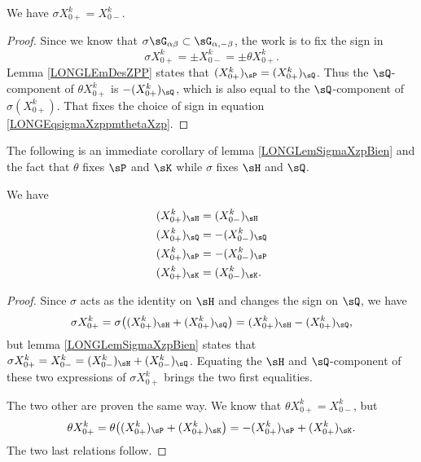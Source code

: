 \begin{lemma}				\label{LONGLemSigmaXzpBien}
	We have $\sigma X^k_{0+}=X^k_{0-}$.
\end{lemma}

\begin{proof}
	Since we know that $\sigma\sG_{\alpha\beta}\subset\sG_{\alpha,-\beta}$, the work is to fix the sign in
	\begin{equation}		\label{LONGEqsigmaXzppmthetaXzp}
		\sigma X^k_{0+}=\pm X^k_{0-}=\pm\theta X^k_{0+}.
	\end{equation}
	Lemma \ref{LONGLEmDesZPP} states that $(X_{0+}^k)_{\sP}=(X_{0+}^k)_{\sQ}$. Thus the $\sQ$-component of $\theta X^k_{0+}$ is $-(X^k_{0+})_{\sQ}$, which is also equal to the $\sQ$-component of $\sigma(X^k_{0+})$. That  fixes the choice of sign in equation \eqref{LONGEqsigmaXzppmthetaXzp}.
\end{proof}

The following is an immediate corollary of lemma \ref{LONGLemSigmaXzpBien} and the fact that $\theta$ fixes $\sP$ and $\sK$ while $\sigma$ fixes $\sH$ and $\sQ$.

\begin{corollary}		\label{LONGCorXzpHQPKXzm}
	We have
	\begin{subequations}
		\begin{align}
			(X^k_{0+})_{\sH}	&=(X^k_{0-})_{\sH}\\
			(X^k_{0+})_{\sQ}	&=-(X^k_{0-})_{\sQ}\\
			(X^k_{0+})_{\sP}	&=-(X^k_{0-})_{\sP}\\
			(X^k_{0+})_{\sK}	&=(X^k_{0-})_{\sK}.
		\end{align}
	\end{subequations}
\end{corollary}

\begin{proof}
	Since $\sigma$ acts as the identity on $\sH$ and changes the sign on $\sQ$, we have
	\begin{equation}
		\sigma X^k_{0+}=\sigma\big(  (X^k_{0+})_{\sH}+(X^k_{0+})_{\sQ}  \big)=(X^k_{0+})_{\sH}-(X^k_{0+})_{\sQ},
	\end{equation}
	but lemma \ref{LONGLemSigmaXzpBien} states that $\sigma X^k_{0+}=X^k_{0-}=(X^k_{0-})_{\sH}+(X^k_{0-})_{\sQ}$. Equating the $\sH$ and $\sQ$-component of these two expressions of $\sigma X^k_{0+}$ brings the two first equalities.

	The two other are proven the same way. We know that $\theta X^k_{0+}=X^k_{0-}$, but
	\begin{equation}
		\theta X^k_{0+}=\theta\big( (X^k_{0+})_{\sP}+(X^k_{0+})_{\sK} \big)=-(X^k_{0+})_{\sP}+(X^k_{0+})_{\sK}.
	\end{equation}
	The two last relations follow.
\end{proof}

